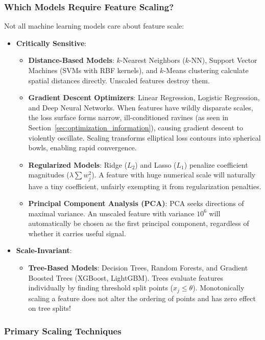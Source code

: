 \subsubsection{Which Models Require Feature Scaling?}
Not all machine learning models care about feature scale:
\begin{itemize}
    \item \textbf{Critically Sensitive}:
    \begin{itemize}
        \item \textbf{Distance-Based Models}: $k$-Nearest Neighbors ($k$-NN), Support Vector Machines (SVMs with RBF kernels), and $k$-Means clustering calculate spatial distances directly. Unscaled features destroy them.
        \item \textbf{Gradient Descent Optimizers}: Linear Regression, Logistic Regression, and Deep Neural Networks. When features have wildly disparate scales, the loss surface forms narrow, ill-conditioned ravines (as seen in Section~\ref{sec:optimization_information}), causing gradient descent to violently oscillate. Scaling transforms elliptical loss contours into spherical bowls, enabling rapid convergence.
        \item \textbf{Regularized Models}: Ridge ($L_2$) and Lasso ($L_1$) penalize coefficient magnitudes ($\lambda \sum w_j^2$). A feature with huge numerical scale will naturally have a tiny coefficient, unfairly exempting it from regularization penalties.
        \item \textbf{Principal Component Analysis (PCA)}: PCA seeks directions of maximal variance. An unscaled feature with variance $10^6$ will automatically be chosen as the first principal component, regardless of whether it carries useful signal.
    \end{itemize}
    \item \textbf{Scale-Invariant}:
    \begin{itemize}
        \item \textbf{Tree-Based Models}: Decision Trees, Random Forests, and Gradient Boosted Trees (XGBoost, LightGBM). Trees evaluate features individually by finding threshold split points ($x_j \le \theta$). Monotonically scaling a feature does not alter the ordering of points and has zero effect on tree splits!
    \end{itemize}
\end{itemize}

\subsubsection{Primary Scaling Techniques}
